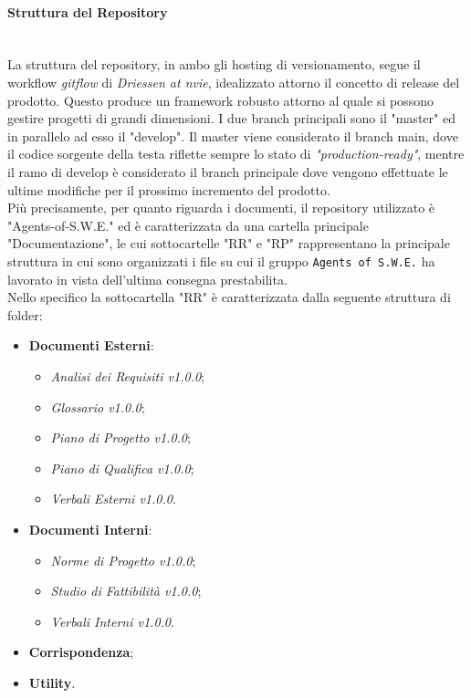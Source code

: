 \paragraph{Struttura del Repository} \-\\ 
La struttura del repository, in ambo gli hosting di versionamento, segue il workflow \textit{gitflow} di \textit{Driessen at nvie}, idealizzato attorno il concetto di release del prodotto. Questo produce un framework robusto attorno al quale si possono gestire progetti di grandi dimensioni. I due branch principali sono il "master" ed in parallelo ad esso il "develop". 
Il master viene considerato il branch main, dove il codice sorgente della testa riflette sempre lo stato di \textit{"production-ready"},
mentre il ramo di develop è considerato il branch principale dove vengono effettuate le ultime modifiche per il prossimo incremento del prodotto.\\
Più precisamente, per quanto riguarda i documenti, il repository utilizzato è "Agents-of-S.W.E." ed è caratterizzata da una cartella principale "Documentazione", le cui sottocartelle "RR" e "RP" rappresentano la principale struttura in cui sono organizzati i file su cui il gruppo \texttt{Agents of S.W.E.} ha lavorato in vista dell'ultima consegna prestabilita.\\
	Nello specifico la sottocartella "RR" è caratterizzata dalla seguente struttura di folder:
	\begin{itemize}
	\item \textbf{Documenti Esterni}:
		\begin{itemize}
		\item \textit{Analisi dei Requisiti v1.0.0};
		\item \textit{Glossario v1.0.0};
		\item \textit{Piano di Progetto v1.0.0};
		\item \textit{Piano di Qualifica v1.0.0};
		\item \textit{Verbali Esterni v1.0.0}.
		\end{itemize}
	\item \textbf{Documenti Interni}:
		\begin{itemize}
		\item \textit{Norme di Progetto v1.0.0};
		\item \textit{Studio di Fattibilità v1.0.0};
		\item \textit{Verbali Interni v1.0.0}.
		\end{itemize}
	\item \textbf{Corrispondenza};
	\item \textbf{Utility}.
	\end{itemize}
